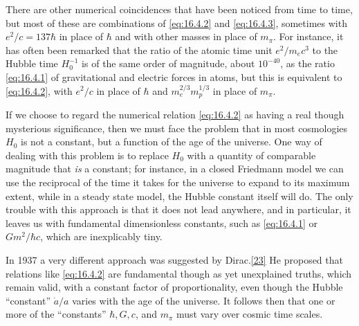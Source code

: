 There are other numerical coincidences that have been noticed from time to
time, but most of these are combinations of \eqref{eq:16.4.2} and
\eqref{eq:16.4.3}, sometimes with \(e^2/c=137\hbar\) in place of \(\hbar\)
and with other masses in place of \(m_\pi\). For instance, it has often been
remarked that the ratio of the atomic time unit \(e^2/m_ec^3\) to the Hubble
time \(H_0^{-1}\) is of the same order of magnitude, about \(10^{-40}\), as
the ratio \eqref{eq:16.4.1} of gravitational and electric forces in atoms,
but this is equivalent to \eqref{eq:16.4.2}, with \(e^2/c\) in place of
\(\hbar\) and \(m_e^{2/3}m_p^{1/3}\) in place of \(m_\pi\).

If we choose to regard the numerical relation \eqref{eq:16.4.2} as having a
real though mysterious significance, then we must face the problem that in most
cosmologies \(H_0\) is not a constant, but a function of the age of the
universe. One way of dealing with this problem is to replace \(H_0\) with a
quantity of comparable magnitude that \emph{is} a constant; for instance, in a
closed Friedmann model we can use the reciprocal of the time it takes for the
universe to expand to its maximum extent, while in a steady state model, the
Hubble constant itself will do. The only trouble with this approach is that it
does not lead anywhere, and in particular, it leaves us with fundamental
dimensionless constants, such as \eqref{eq:16.4.1} or \(Gm^2/\hbar c\), which
are inexplicably tiny.

In 1937 a very different approach was suggested by
Dirac.\hyperref[ch16-ref-23]{[23]} He proposed that relations like
\eqref{eq:16.4.2} are fundamental though as yet unexplained truths, which
remain valid, with a constant factor of proportionality, even though the Hubble
``constant'' \(\dot a/a\) varies with the age of the universe. It follows then
that one or more of the ``constants'' \(\hbar,G,c\), and \(m_\pi\) must vary
over cosmic time scales.

